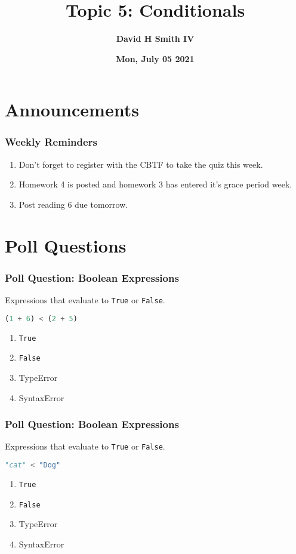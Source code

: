 \documentclass{beamer}
\title{\textbf{Topic 5: Conditionals}}
\author{\textbf{David H Smith IV}}
\institute[\textbf{UIUC}]{\textbf{University of Illinois Urbana-Champaign}}
\date{\textbf{Mon, July 05 2021}}
\begin{document}
\frame{\titlepage}

\section{Announcements}

%
%
\begin{frame}
  \frametitle{Weekly Reminders}
  \begin{enumerate}[A]
    \item Don't forget to register with the CBTF to take the quiz this week.
    \item Homework 4 is posted and homework 3 has entered it's grace period week.
    \item Post reading 6 due tomorrow.
  \end{enumerate}
\end{frame}


\section{Poll Questions}

%
%
\begin{frame}[fragile]
  \frametitle{Poll Question: Boolean Expressions}
  Expressions that evaluate to \lstinline|True| or \lstinline|False|. 
  \begin{lstlisting}[language=Python, autogobble]
  (1 + 6) < (2 + 5)
  \end{lstlisting}
  \vfill
  \begin{enumerate}[A]
    \item \lstinline|True|
    \item \lstinline|False|
    \item TypeError
    \item SyntaxError
  \end{enumerate}
\end{frame}

%
%
\begin{frame}[fragile]
  \frametitle{Poll Question: Boolean Expressions}
  Expressions that evaluate to \lstinline|True| or \lstinline|False|. 
  \begin{lstlisting}[language=Python, autogobble]
  "cat" < "Dog"
  \end{lstlisting}
  \vfill
  \begin{enumerate}[A]
    \item \lstinline|True|
    \item \lstinline|False|
    \item TypeError
    \item SyntaxError
  \end{enumerate}
\end{frame}
\end{document}
